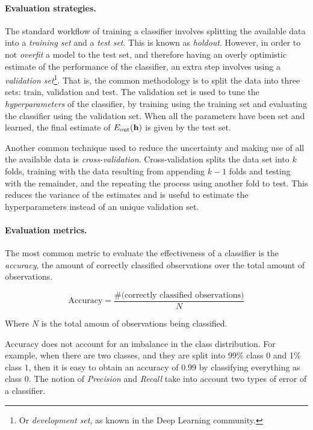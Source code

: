 \paragraph{Evaluation strategies.}

The standard workflow of training a classifier involves splitting the available
data into a {\em training set} and a {\em test set}. 
%
This is known as {\em holdout}.
%
However, in order to not {\em overfit} a model to the test set, and therefore
having an overly optimistic estimate of the performance of the classifier, an
extra step involves using a {\em validation set}\footnote{Or {\em development
set}, as known in the Deep Learning community.}.
%
That is, the common methodology is to split the data into three sets: train,
validation and test.
%
The validation set is used to tune the {\em hyperparameters} of the classifier,
by training using the training set and evaluating the classifier using the
validation set.
%
When all the parameters have been set and learned, the final estimate of
$E_{\text{out}}(\boldsymbol{\mathbf{h}})$ is given by the test set.


Another common technique used to reduce the uncertainty and making use of all
the available data is {\em cross-validation}.
%
Cross-validation splits the data set into $k$ folds, training with the data
resulting from appending $k-1$ folds and testing with the remainder, and the
repeating the process using another fold to test.
%
This reduces the variance of the estimates and is useful to estimate the
hyperparameters instead of an unique validation set.


\paragraph{Evaluation metrics.} 
%
The most common metric to evaluate the effectiveness of a classifier is the {\em
accuracy}, the amount of correctly classified observations over the total amount of
observations.

\begin{equation}
    \text{Accuracy} = \frac{\text{\#(correctly\ classified\ observations)}}{N}
\end{equation}

Where $N$ is the total amoun of observations being classified.

Accuracy does not account for an imbalance in the class distribution.
%
For example, when there are two classes, and they are split into 99\% class $0$
and 1\% class $1$, then it is easy to obtain an accuracy of $0.99$ by
classifying everything as class $0$.
%
The notion of {\em Precision} and {\em Recall} take into account two types of
error of a classifier.

